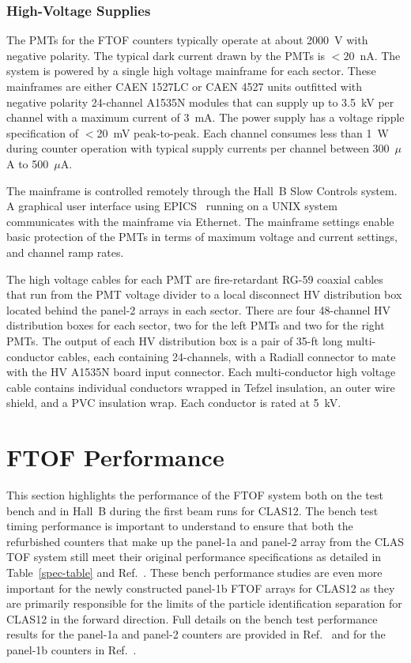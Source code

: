 \documentclass{elsart}
\begin{document}
\subsubsection{High-Voltage Supplies}

The PMTs for the FTOF counters typically operate at about 2000~V with negative polarity. The typical
dark current drawn by the PMTs is $<20$~nA. The system is powered by a single high voltage mainframe
for each sector. These mainframes are either CAEN 1527LC or CAEN 4527 units outfitted with negative
polarity 24-channel A1535N modules that can supply up to 3.5~kV per channel with a maximum current of
3~mA. The power supply has a voltage ripple specification of $<$20~mV peak-to-peak. Each channel
consumes less than 1~W during counter operation with typical supply currents per channel between
300~$\mu$A to 500~$\mu$A.

The mainframe is controlled remotely through the Hall~B Slow Controls system. A graphical user interface
using EPICS~\cite{epics} running on a UNIX system communicates with the mainframe via Ethernet. The
mainframe settings enable basic protection of the PMTs in terms of maximum voltage and current settings,
and channel ramp rates.

The high voltage cables for each PMT are fire-retardant RG-59 coaxial cables that run from the PMT
voltage divider to a local disconnect HV distribution box located behind the panel-2 arrays in each
sector. There are four 48-channel HV distribution boxes for each sector, two for the left PMTs and two
for the right PMTs. The output of each HV distribution box is a pair of 35-ft long multi-conductor cables,
each containing 24-channels, with a Radiall connector to mate with the HV A1535N board input connector.
Each multi-conductor high voltage cable contains individual conductors wrapped in Tefzel insulation, an outer
wire shield, and a PVC insulation wrap. Each conductor is rated at 5~kV.

\section{FTOF Performance}
\label{sec:performance}

This section highlights the performance of the FTOF system both on the test bench and in Hall~B
during the first beam runs for CLAS12. The bench test timing performance is important to
understand to ensure that both the refurbished counters that make up the panel-1a and panel-2
array from the CLAS TOF system still meet their original performance specifications as detailed
in Table~\ref{spec-table} and Ref.~\cite{tof-nim}. These bench performance studies are even more
important for the newly constructed panel-1b FTOF arrays for CLAS12 as they are primarily
responsible for the limits of the particle identification separation for CLAS12 in the forward direction.
Full details on the bench test performance results for the panel-1a and panel-2 counters are provided
in Ref.~\cite{dsc-cn2013-001} and for the panel-1b counters in Ref.~\cite{nim-p1b}.
\end{document}

